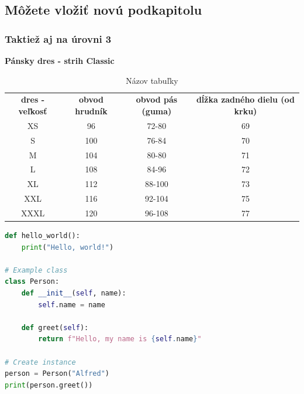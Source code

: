 \subsection{Môžete vložiť novú podkapitolu}
\subsubsection{Taktiež aj na úrovni 3}

\begin{table}[!h]
    \centering
    \caption{Názov tabuľky}
    {\color{red} \textbf{Pánsky dres - strih Classic}}\\
    \vspace{1em}
    \begin{tabular}{cccc}  
        \textbf{dres - veľkosť} & \textbf{obvod hrudník} & \textbf{obvod pás (guma)} & \textbf{dĺžka zadného dielu (od krku)} \\
        XS & 96 & 72-80 & 69 \\
        S & 100 & 76-84 & 70 \\
        M & 104 & 80-80 & 71 \\
        L & 108 & 84-96 & 72 \\
        XL & 112 & 88-100 & 73 \\
        XXL & 116 & 92-104 & 75 \\
        XXXL & 120 & 96-108 & 77 \\
    \end{tabular}
    \label{tab:example}
\end{table}

\begin{lstlisting}[language=Python, caption={Príklad kódu v Pythone}, label={lst:python-example}]    
def hello_world():
    print("Hello, world!")
        
# Example class
class Person:
    def __init__(self, name):
        self.name = name
    
    def greet(self):
        return f"Hello, my name is {self.name}"

# Create instance
person = Person("Alfred")
print(person.greet())
\end{lstlisting}